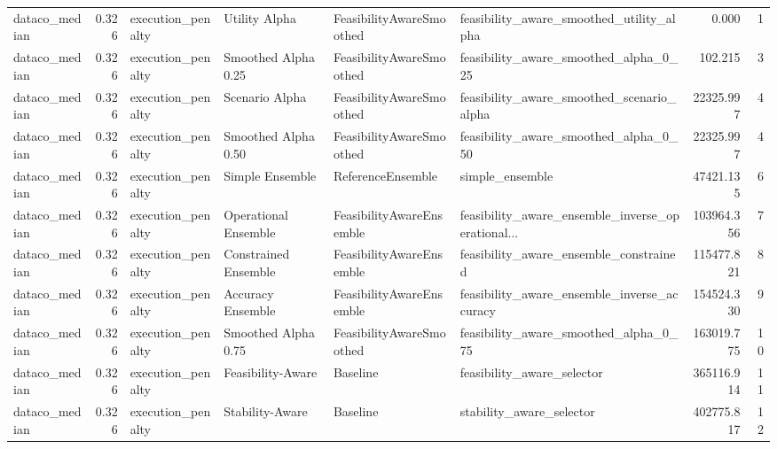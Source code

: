 \begin{table}
{\begin{tabular}{lrllllrr}
 dataco\_median &             0.326 &           execution\_penalty &         Utility Alpha &  FeasibilityAwareSmoothed &           feasibility\_aware\_smoothed\_utility\_alpha &         0.000 &               1 \\
 dataco\_median &             0.326 &           execution\_penalty &   Smoothed Alpha 0.25 &  FeasibilityAwareSmoothed &              feasibility\_aware\_smoothed\_alpha\_0\_25 &       102.215 &               3 \\
 dataco\_median &             0.326 &           execution\_penalty &        Scenario Alpha &  FeasibilityAwareSmoothed &          feasibility\_aware\_smoothed\_scenario\_alpha &     22325.997 &               4 \\
 dataco\_median &             0.326 &           execution\_penalty &   Smoothed Alpha 0.50 &  FeasibilityAwareSmoothed &              feasibility\_aware\_smoothed\_alpha\_0\_50 &     22325.997 &               4 \\
 dataco\_median &             0.326 &           execution\_penalty &       Simple Ensemble &         ReferenceEnsemble &                                    simple\_ensemble &     47421.135 &               6 \\
 dataco\_median &             0.326 &           execution\_penalty &  Operational Ensemble &  FeasibilityAwareEnsemble &  feasibility\_aware\_ensemble\_inverse\_operational... &    103964.356 &               7 \\
 dataco\_median &             0.326 &           execution\_penalty &  Constrained Ensemble &  FeasibilityAwareEnsemble &             feasibility\_aware\_ensemble\_constrained &    115477.821 &               8 \\
 dataco\_median &             0.326 &           execution\_penalty &     Accuracy Ensemble &  FeasibilityAwareEnsemble &        feasibility\_aware\_ensemble\_inverse\_accuracy &    154524.330 &               9 \\
 dataco\_median &             0.326 &           execution\_penalty &   Smoothed Alpha 0.75 &  FeasibilityAwareSmoothed &              feasibility\_aware\_smoothed\_alpha\_0\_75 &    163019.775 &              10 \\
 dataco\_median &             0.326 &           execution\_penalty &     Feasibility-Aware &                  Baseline &                         feasibility\_aware\_selector &    365116.914 &              11 \\
 dataco\_median &             0.326 &           execution\_penalty &       Stability-Aware &                  Baseline &                           stability\_aware\_selector &    402775.817 &              12 \\

\end{tabular}}
\end{table}
